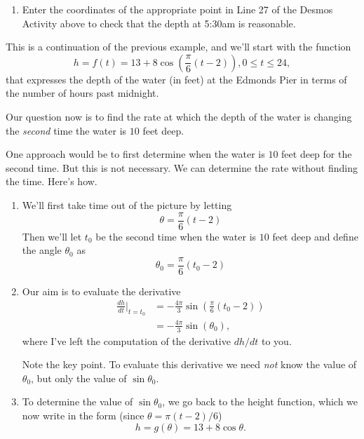 \documentclass{ximera}
\begin{document}
\begin{example}
\begin{explanation}
\begin{enumerate}
\item Enter the coordinates of the appropriate point in Line 27 of the Desmos Activity above to check that the depth at 5:30am is reasonable.

\end{enumerate}

\end{explanation}

\end{example}


\begin{example}  \label{Q4vdtggbghh}
This is a continuation of the previous example, and we'll start with the function
\[
   h  = f(t) = 13 + 8 \cos \left(  \frac{\pi}{6} \left( t - 2 \right) \right),  0\leq t \leq 24,
\]
that expresses the depth of the water (in feet) at the Edmonds Pier in terms of the number of hours past midnight.

Our question now is to find the rate at which the depth of the water is changing the \emph{second} time the water is $10$ feet deep. 

One approach would be to first determine when the water is $10$ feet deep for the second time. But this is not necessary. We can determine the rate without finding the time. Here's how.

\begin{enumerate}

\item We'll first take time out of the picture by letting
\[
   \theta = \frac{\pi}{6} \left( t - 2 \right)
\]
Then we'll let $t_0$ be the second time when the water is $10$ feet deep and define the angle $\theta_0$ as 
\[
   \theta_0 = \frac{\pi}{6} \left( t_0 - 2 \right)
\]

\item Our aim is to evaluate the derivative
\begin{align*}
  \frac{dh}{dt}\Big|_{t=t_0} &= -\frac{4\pi}{3} \sin\left( \frac{\pi}{6} \left( t_0 - 2 \right)   \right)   \\
                                          &= -\frac{4\pi}{3} \sin\left( \theta_0   \right) ,
\end{align*} 
where I've left the computation of the derivative $dh/dt$ to you.

Note the key point. To evaluate this derivative we need \emph{not} know the value of $\theta_0$, but only the value of $\sin\theta_0$.

\item To determine the value of $\sin\theta_0$, we go back to the height function, which we now write in the form (since $\theta = \pi(t-2)/6$)
\[
     h = g(\theta) = 13 + 8\cos \theta .
\]


\end{enumerate}
\end{example}
\end{document}
